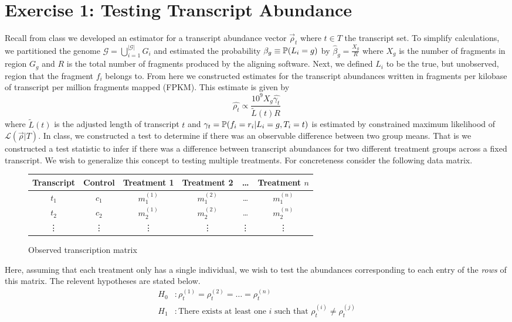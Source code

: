 \documentclass[11pt]{article}
\begin{document}
\section{Exercise 1: Testing Transcript Abundance}

Recall from class we developed an estimator for a transcript abundance vector $\vec{\rho}_t$ where $t\in T$ the transcript set. To simplify calculations, we partitioned the genome $\mathcal{G} = \bigcup_{i=1}^{|\mathcal{G}|}G_i$ and estimated the probability $\beta_g\equiv{\mathbb{P}}(L_i = g)$ by $\hat{\beta}_g = \frac{X_g}{R}$ where $X_g$ is the number of fragments in region $G_g$ and $R$ is the total number of fragments produced by the aligning software. Next, we defined $L_i$ to be the true, but unobserved, region that the fragment $f_i$ belongs to. From here we constructed estimates for the transcript abundances written in fragments per kilobase of transcript per million fragments mapped (FPKM). This estimate is given by 
\begin{equation}
\hat{\rho_t}\propto \frac{10^9X_g\hat{\gamma_t}}{\tilde{L}(t)R}
\end{equation}
where $\tilde{L}(t)$ is the adjusted length of transcript $t$ and $\gamma_t = {\mathbb{P}}(f_i = r_i|L_i = g, T_i = t)$ is estimated by constrained maximum likelihood of $\mathcal{L}(\vec{\rho}|T)$. In class, we constructed a test to determine if there was an observable difference between two group means. That is we constructed a test statistic to infer if there was a difference between transcript abundances for two different treatment groups across a fixed transcript. We wish to generalize this concept to testing multiple treatments. For concreteness consider the following data matrix.
\begin{figure}[h!]
	\centering
	\begin{tabular}{|c|c|c|c|c|c|}
	\hline
		Transcript & Control & Treatment 1 & Treatment 2 & \ldots & Treatment $n$\\
		\hline
		$t_1$ & $c_{1}$ & $m^{(1)}_{1}$ & $m^{(2)}_{1}$ & \ldots & $m^{(n)}_{1}$\\
		$t_2$ & $c_{2}$ & $m^{(1)}_{2}$ & $m^{(2)}_{2}$ & \ldots & $m^{(n)}_{2}$\\
		\vdots &\vdots &\vdots &\vdots &\vdots &\vdots\\
		\hline  
	\end{tabular}
	\caption{Observed transcription matrix}
\end{figure}
Here, assuming that each treatment only has a single individual, we wish to test the abundances corresponding to each entry of the \textit{rows} of this matrix. The relevent hypotheses are stated below. 
\begin{align}
H_0&: \rho_t^{(1)} = \rho_t^{(2)} = \dots = \rho_t^{(n)}\\
H_1&: \text{There exists at least one $i$ such that $\rho_t^{(i)} \neq \rho_t^{(j)}$}
\end{align} 
\end{document}

